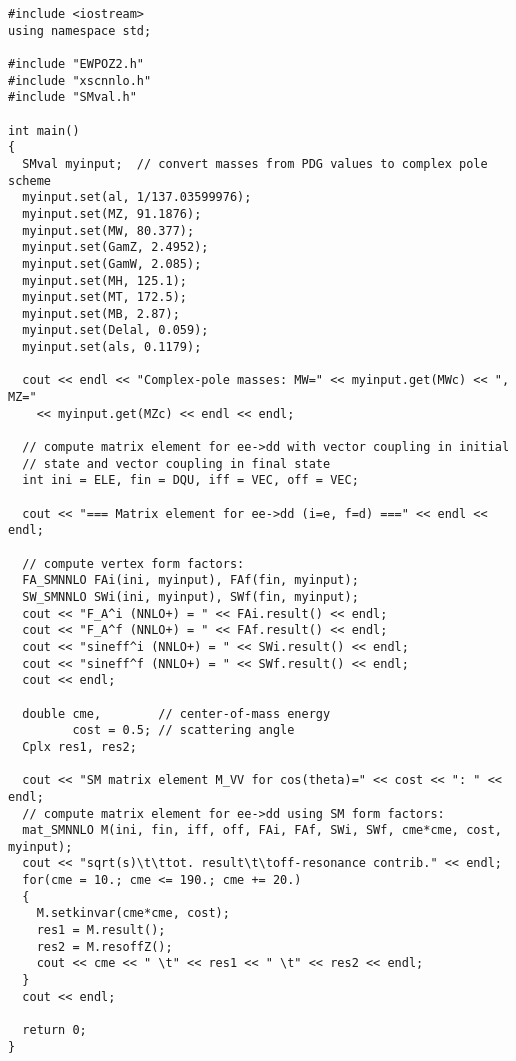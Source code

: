 \documentclass[12pt]{article}
\newcommand{\seff}[1]{\sin^2\theta_{\rm eff}^{#1}}
\newcommand{\fva}[1]{F_{V,A}^{#1}}
\begin{document}
{    \centering
\begin{lstlisting}
#include <iostream>
using namespace std;

#include "EWPOZ2.h"
#include "xscnnlo.h"
#include "SMval.h"

int main()
{
  SMval myinput;  // convert masses from PDG values to complex pole scheme
  myinput.set(al, 1/137.03599976);
  myinput.set(MZ, 91.1876);
  myinput.set(MW, 80.377);
  myinput.set(GamZ, 2.4952);
  myinput.set(GamW, 2.085);
  myinput.set(MH, 125.1);
  myinput.set(MT, 172.5);
  myinput.set(MB, 2.87);
  myinput.set(Delal, 0.059);
  myinput.set(als, 0.1179);
  
  cout << endl << "Complex-pole masses: MW=" << myinput.get(MWc) << ", MZ=" 
    << myinput.get(MZc) << endl << endl;
 
  // compute matrix element for ee->dd with vector coupling in initial
  // state and vector coupling in final state
  int ini = ELE, fin = DQU, iff = VEC, off = VEC;
  
  cout << "=== Matrix element for ee->dd (i=e, f=d) ===" << endl << endl;
  
  // compute vertex form factors:
  FA_SMNNLO FAi(ini, myinput), FAf(fin, myinput);
  SW_SMNNLO SWi(ini, myinput), SWf(fin, myinput);
  cout << "F_A^i (NNLO+) = " << FAi.result() << endl;
  cout << "F_A^f (NNLO+) = " << FAf.result() << endl;
  cout << "sineff^i (NNLO+) = " << SWi.result() << endl;
  cout << "sineff^f (NNLO+) = " << SWf.result() << endl;
  cout << endl;
  
  double cme,        // center-of-mass energy
         cost = 0.5; // scattering angle
  Cplx res1, res2;

  cout << "SM matrix element M_VV for cos(theta)=" << cost << ": " << endl;
  // compute matrix element for ee->dd using SM form factors:
  mat_SMNNLO M(ini, fin, iff, off, FAi, FAf, SWi, SWf, cme*cme, cost, myinput);
  cout << "sqrt(s)\t\ttot. result\t\toff-resonance contrib." << endl;
  for(cme = 10.; cme <= 190.; cme += 20.)
  {
    M.setkinvar(cme*cme, cost);
    res1 = M.result();
    res2 = M.resoffZ();
    cout << cme << " \t" << res1 << " \t" << res2 << endl;
  }
  cout << endl;

  return 0;
}
\end{lstlisting}}
\end{document}
